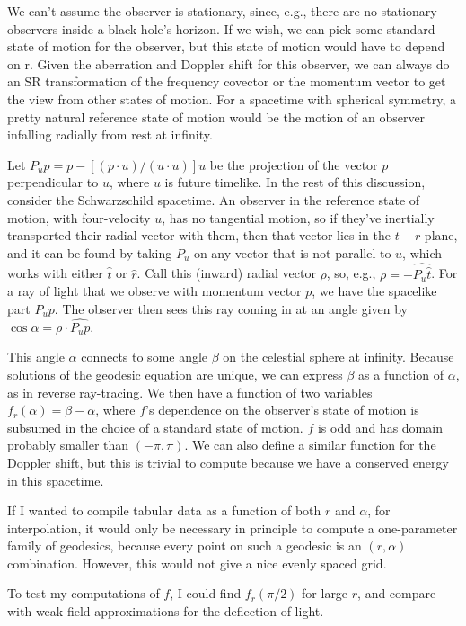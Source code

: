 \documentclass{article}
\begin{document}
We can't assume the observer is stationary, since, e.g., there are no stationary observers inside a
black hole's horizon. If we wish, we can pick some standard state of motion for the observer, but this state
of motion would have to depend on r. Given the aberration and Doppler shift for this observer,
we can always do an SR transformation of the frequency covector or the momentum vector to get
the view from other states of motion. For a spacetime with spherical symmetry,
a pretty natural reference state of motion would be
the motion of an observer infalling radially from rest at infinity.

Let $P_u p=p-[(p\cdot u)/(u\cdot u)]u$ be the projection of the vector $p$ perpendicular to $u$,
where $u$ is future timelike. In the rest of this discussion, consider the Schwarzschild spacetime.
An observer in the reference state of motion, with four-velocity $u$,
has no tangential motion, so if they've inertially transported their radial vector with them, then
that vector lies in the $t-r$ plane, and it can be found by taking $P_u$ on any vector that is not
parallel to $u$, which works with either $\hat{t}$ or $\hat{r}$. Call this (inward) radial
vector $\rho$, so, e.g.,
$\rho=-\widehat{P_u\hat{t}}$. For a ray of light that we observe with momentum vector $p$, we have
the spacelike part $P_u p$. The observer then sees this ray coming in at an angle given by
$\cos\alpha=\rho \cdot \widehat{P_u p}$.

This angle $\alpha$ connects to some angle $\beta$ on the celestial
sphere at infinity. Because solutions of the geodesic equation are
unique, we can express $\beta$ as a function of $\alpha$, as in
reverse ray-tracing. We then have a function of two variables
$f_r(\alpha)=\beta-\alpha$, where $f$'s dependence on the observer's
state of motion is subsumed in the choice of a standard state of
motion. $f$ is odd and has domain probably smaller than $(-\pi,\pi)$. We can
also define a similar function for the Doppler shift, but this is trivial
to compute because we have a conserved energy in this spacetime.

If I wanted to compile tabular data as a function of both $r$ and $\alpha$,
for interpolation, it would only be necessary in principle to compute a
one-parameter family of geodesics, because every point on such a geodesic
is an $(r,\alpha)$ combination. However, this would not give a nice evenly spaced
grid.

To test my computations of $f$, I could find $f_r(\pi/2)$ for large $r$, and
compare with weak-field approximations for the deflection of light.
\end{document}
